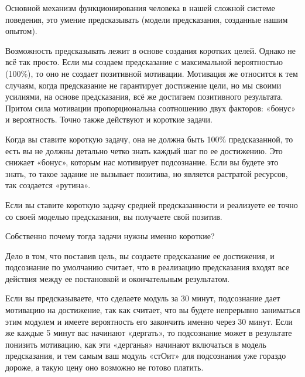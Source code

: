 \documentclass{../industrial-development}
\begin{document}

\lecturenotes

Основной механизм функционирования человека в нашей сложной системе поведения, это умение предсказывать (модели предсказания, созданные нашим опытом). 

Возможность предсказывать лежит в основе создания коротких целей. Однако не всё так просто.
Если мы создаем предсказание с максимальной вероятностью (100\%), то оно не создает позитивной мотивации.
Мотивация же относится к тем случаям, когда предсказание не гарантирует достижение цели, но мы своими усилиями, на основе предсказания, всё же достигаем позитивного результата. Притом сила мотивации пропорциональна соотношению двух факторов: «бонус» и вероятность.
Точно также действуют и короткие задачи.

Когда вы ставите короткую задачу, она не должна быть 100\% предсказанной, то есть вы не должны детально четко знать каждый шаг по ее достижению. Это снижает «бонус», которым нас мотивирует подсознание. Если вы будете это знать, то такое задание не вызывает позитива, но является растратой ресурсов, так создается «рутина».

Если вы ставите короткую задачу средней предсказанности и реализуете ее точно со своей моделью предсказания, вы получаете свой позитив.

Собственно почему тогда задачи нужны именно короткие?

Дело в том, что поставив цель, вы создаете предсказание ее достижения, и подсознание по умолчанию считает, что в реализацию предсказания входят все действия между ее постановкой и окончательным результатом.

Если вы предсказываете, что сделаете модуль за 30 минут, подсознание дает мотивацию на достижение, так как считает, что вы будете непрерывно заниматься этим модулем и имеете вероятность его закончить именно через 30 минут.
Если же каждые 5 минут вас начинают «дергать», то подсознание может в результате понизить мотивацию, как эти «дерганья» начинают включаться в модель предсказания, и тем самым ваш модуль «стОит» для подсознания уже гораздо дороже, а такую цену оно возможно не готово платить.
\end{document}
